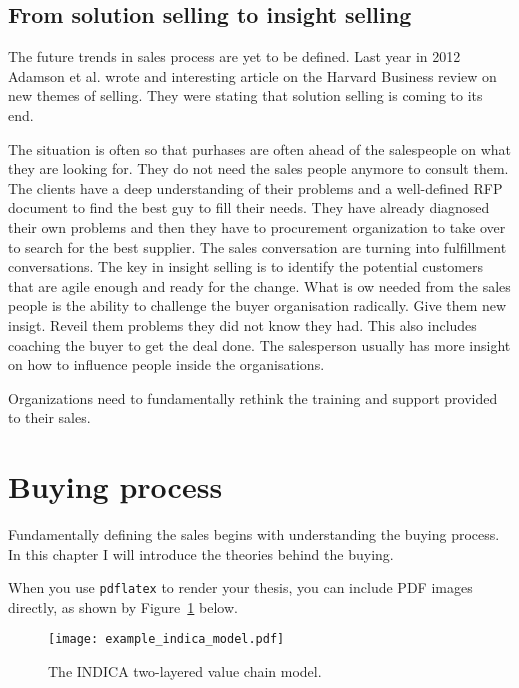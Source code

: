 \documentclass[12pt,a4paper,oneside,pdftex]{report}
\begin{document}
\subsection{From solution selling to insight selling}
The future trends in sales process are yet to be defined. Last year in 2012 Adamson et al. wrote and interesting article on the Harvard Business review on new themes of selling. They were stating that solution selling is coming to its end. 

The situation is often so that purhases are often ahead of the salespeople on what they are looking for. They do not need the sales people anymore to consult them. The clients have a deep understanding of their problems and a well-defined RFP document to find the best guy to fill their needs. They have already diagnosed their own problems and then they have to procurement organization to take over to search for the best supplier. The sales conversation are turning into fulfillment conversations. 
The key in insight selling is to identify the potential customers that are agile enough and ready for the change. What is ow needed from the sales people is the ability to challenge the buyer organisation radically. Give them new insigt. Reveil them problems they did not know they had. 
This also includes coaching the buyer to get the deal done. The salesperson usually has more insight on how to influence people inside the organisations. 

Organizations need to fundamentally rethink the training and support provided to their sales. 

\section{Buying process}

Fundamentally defining the sales begins with understanding the buying process. In this chapter I will introduce the theories behind the buying. 


When you use \texttt{pdflatex} to render your thesis, you can include PDF images
directly, as shown by Figure~\ref{fig:indica_model} below.

\begin{figure}[ht]
  \begin{center}
    \texttt{[image: example\_indica\_model.pdf]}
    \caption{The INDICA two-layered value chain model.}
    \label{fig:indica_model}
  \end{center}
\end{figure}
\end{document}
